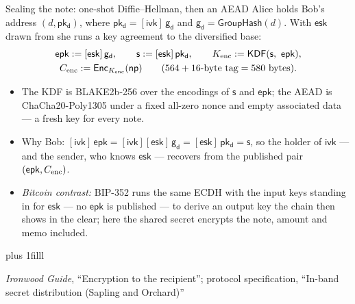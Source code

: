 \documentclass[aspectratio=169,11pt]{beamer}
\newcommand{\gd}{\ensuremath{\mathsf{g_d}}}
\newcommand{\pkd}{\ensuremath{\mathsf{pk_d}}}
\newcommand{\ivk}{\ensuremath{\mathsf{ivk}}}
\newcommand{\esk}{\ensuremath{\mathsf{esk}}}
\newcommand{\epk}{\ensuremath{\mathsf{epk}}}
\newcommand{\GroupHash}{\ensuremath{\mathsf{GroupHash}}}
\newcommand{\src}[1]{\par\vskip0pt plus 1filll
  {\fontsize{6}{7.2}\selectfont\color{arbdim}\raggedright #1\par}}
\begin{document}
\begin{frame}{Sealing the note: one-shot Diffie--Hellman, then an AEAD}
Alice holds Bob's address $(d, \pkd)$, where $\pkd = [\ivk]\,\gd$ and
$\gd = \GroupHash(d)$. With \esk{} drawn from \Frseed{} she runs a key
agreement to the diversified base:
\begin{gather*}
\epk := [\esk]\,\gd, \qquad
\mathsf{s} := [\esk]\,\pkd, \qquad
\Fkenc := \mathsf{KDF}(\mathsf{s},\ \epk),\\
\Fenc := \mathsf{Enc}_{\Fkenc}(\Fnp)
\qquad (564 + 16\text{-byte tag} = 580 \text{ bytes}).
\end{gather*}
\begin{itemize}
  \item The KDF is BLAKE2b-256 over the encodings of $\mathsf{s}$ and
    \epk; the AEAD is ChaCha20-Poly1305 under a fixed all-zero nonce and
    empty associated data --- a fresh key for every note.
  \item Why Bob: $[\ivk]\,\epk = [\ivk][\esk]\,\gd = [\esk]\,\pkd =
    \mathsf{s}$, so the holder of \ivk{} --- and the sender, who knows
    \esk{} --- recovers \Fkenc{} from the published pair $(\epk, \Fenc)$.
  \item \emph{Bitcoin contrast:} BIP-352 runs the same ECDH with the
    input keys standing in for \esk{} --- no \epk{} is published --- to
    derive an output key the chain then shows in the clear; here the
    shared secret encrypts the note, amount and memo included.
\end{itemize}
\src{\emph{Ironwood Guide}, ``Encryption to the recipient'';
  protocol specification, ``In-band secret distribution (Sapling and Orchard)''}
\end{frame}
\end{document}
